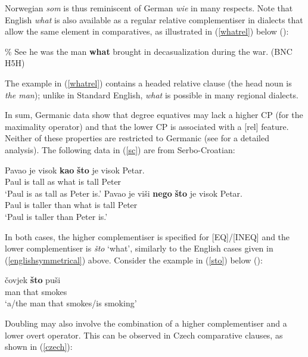 Norwegian \textit{som} is thus reminiscent of German \textit{wie} in many respects. Note that English \textit{what} is also available as a regular relative complementiser in dialects that allow the same element in comparatives, as illustrated in (\ref{whatrel}) below (\citealt[291]{kortmannwagner2007}):

\ea \% See he was the man \textbf{what} brought in decasualization during the war. (BNC H5H) \label{whatrel}
\z

The example in (\ref{whatrel}) contains a headed relative clause (the head noun is \textit{the man}); unlike in Standard English, \textit{what} is possible in many regional dialects.

In sum, Germanic data show that degree equatives may lack a higher CP (for the maximality operator) and that the lower CP is associated with a [rel] feature. Neither of these properties are restricted to Germanic (see \citealt{bacskaiatkari2016alh} for a detailed analysis). The following data in (\ref{sc}) are from Serbo-Croatian:

\ea \label{sc}
\ea \gll Pavao je visok \textbf{kao} \textbf{što} je visok Petar.\\
Paul is tall as what is tall Peter\\
\glt `Paul is as tall as Peter is.'
\ex \gll Pavao je viši \textbf{nego} \textbf{što} je visok Petar.\\
Paul is taller than what is tall Peter\\
\glt `Paul is taller than Peter is.'
\z
\z

In both cases, the higher complementiser is specified for [EQ]/[INEQ] and the lower complementiser is \textit{što} `what', similarly to the English cases given in (\ref{englishsymmetrical}) above. Consider the example in (\ref{sto}) below (\citealt[27, ex. 2]{gracaninyuksek2013}):

\ea \gll čovjek \textbf{što} puši \label{sto}\\
man that smokes\\
\glt `a/the man that smokes/is smoking'
\z

Doubling may also involve the combination of a higher complementiser and a lower overt operator. This can be observed in Czech comparative clauses, as shown in (\ref{czech}):

\ea \label{czech}
\z
\z

